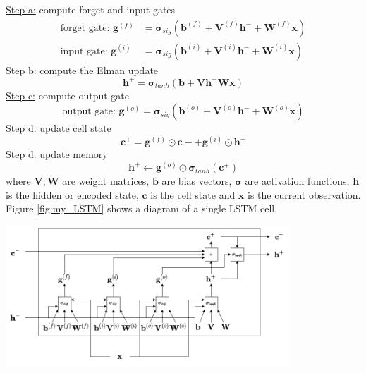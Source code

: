 \documentclass[11pt,preprint, authoryear]{elsarticle}
\let\origfigure\figure
\let\endorigfigure\endfigure
\renewenvironment{figure}[1][2] {
    \expandafter\origfigure\expandafter[H]
} {
    \endorigfigure
}
\numberwithin{equation}{section}
\numberwithin{figure}{section}
\numberwithin{table}{section}
\begin{document}
\underline{Step a:} compute forget and input gates \begin{align}
    \text{forget gate: } \mathbf{g}^{(f)} &= \boldsymbol{\sigma}_{sig}(\mathbf{b}^{(f)} + \mathbf{V}^{(f)} \mathbf{h}^{-} + \mathbf{W}^{(f)}\mathbf{x}) \\
    \text{input gate: } \mathbf{g}^{(i)} &= \boldsymbol{\sigma}_{sig}(\mathbf{b}^{(i)} + \mathbf{V}^{(i)} \mathbf{h}^{-} + \mathbf{W}^{(i)} \mathbf{x})
\end{align} \underline{Step b:} compute the Elman update
\begin{equation}
    \mathbf{h}^{+} = \boldsymbol{\sigma}_{tanh}(\mathbf{b} + \mathbf{V}\mathbf{h}^{-} \mathbf{W}\mathbf{x})
\end{equation} \underline{Step c:} compute output gate \begin{equation}
    \text{output gate: } \mathbf{g}^{(o)} = \boldsymbol{\sigma}_{sig}(\mathbf{b}^{(o)} + \mathbf{V}^{(o)} \mathbf{h}^{-} + \mathbf{W}^{(o)}\mathbf{x})
\end{equation} \underline{Step d:} update cell state \begin{equation}
    \mathbf{c}^{+} = \mathbf{g}^{(f)} \odot \mathbf{c}{-} + \mathbf{g}^{(i)} \odot \mathbf{h}^{+}
\end{equation} \underline{Step d:} update memory \begin{equation}
    \mathbf{h}^{+} \leftarrow \mathbf{g}^{(o)} \odot \boldsymbol{\sigma}_{tanh}(\mathbf{c}^{+})
\end{equation} where \(\mathbf{V}, \mathbf{W}\) are weight matrices,
\(\mathbf{b}\) are bias vectors, \(\boldsymbol{\sigma}\) are activation
functions, \(\mathbf{h}\) is the hidden or encoded state, \(\mathbf{c}\)
is the cell state and \(\mathbf{x}\) is the current observation. Figure
\ref{fig:my_LSTM} shows a diagram of a single LSTM cell.

\begin{figure}[ht]
    \centering
    \includegraphics[width=0.8\textwidth]{"bin/LSTM.drawio.png"}
    \caption{LSTM model architecture}
    \label{fig:my_LSTM}
\end{figure}
\end{document}
